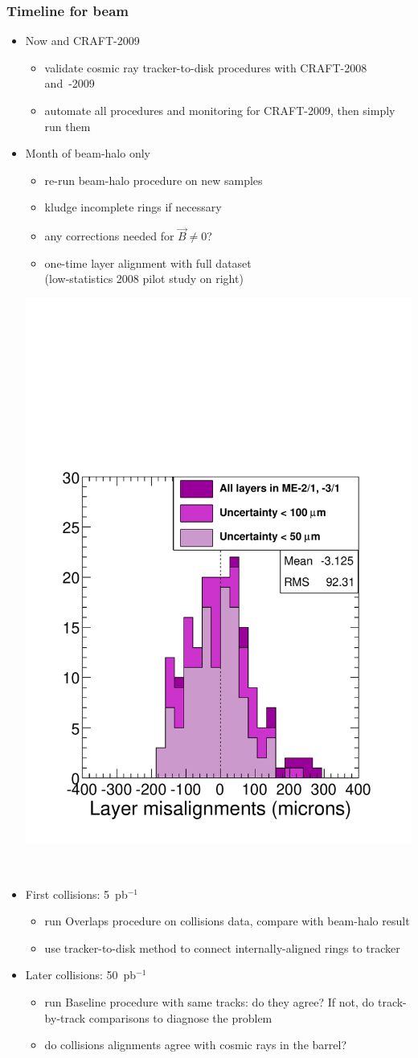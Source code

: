 \documentclass[compress]{beamer}
\begin{document}
\begin{frame}
\frametitle{Timeline for beam}
\scriptsize
\begin{itemize}
\item Now and CRAFT-2009
\begin{itemize}
\item \scriptsize validate cosmic ray tracker-to-disk procedures with CRAFT-2008 \mbox{and -2009\hspace{-1 cm}}
\item \scriptsize automate all procedures and monitoring for CRAFT-2009, then simply run them
\end{itemize}

\item Month of beam-halo only
\begin{itemize}
\item \scriptsize re-run beam-halo procedure on new samples
\item \scriptsize kludge incomplete rings if necessary
\item \scriptsize any corrections needed for $\vec{B} \ne 0$?
\item \scriptsize one-time layer alignment with full dataset \\ {\scriptsize (low-statistics 2008 pilot study on right)}
\end{itemize}

\vspace{-2.90 cm}
\hfill \includegraphics[width=0.3\linewidth]{layer_hist.pdf}

\vspace{-1.20 cm}
\mbox{ }

\item First collisions: 5~pb$^{-1}$
\begin{itemize}
\item \scriptsize run Overlaps procedure on collisions data, compare with beam-halo result
\item \scriptsize use tracker-to-disk method to connect internally-aligned rings to tracker
\end{itemize}

\item Later collisions: 50~pb$^{-1}$
\begin{itemize}
\item \scriptsize run Baseline procedure with same tracks: do they agree?  If not, do track-by-track comparisons to diagnose the problem
\item \scriptsize do collisions alignments agree with cosmic rays in the barrel?
\end{itemize}
\end{itemize}
\end{frame}
\end{document}
